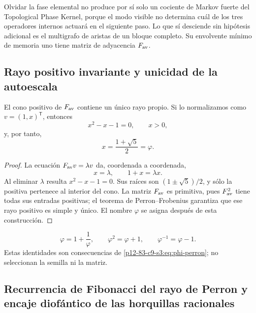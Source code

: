 \begin{remark}
Olvidar la fase elemental no produce por sí solo un cociente de Markov
fuerte del Topological Phase Kernel, porque el modo visible no determina
cuál de los tres operadores internos actuará en el siguiente paso. Lo que
sí desciende sin hipótesis adicional es el multigrafo de aristas de un
bloque completo. Su envolvente mínimo de memoria uno tiene matriz de
adyacencia \(F_{\rm av}\).
\end{remark}

\subsection{Rayo positivo invariante y unicidad de la autoescala}

\begin{theorem}
\label{p12-83-c9-s3:thm:rayo-perron-phi}
El cono positivo de \(F_{\rm av}\) contiene un único rayo propio. Si lo
normalizamos como \(v=(1,x)^{\mathsf T}\), entonces
\[
 x^2-x-1=0,
 \qquad
 x>0,
\]
y, por tanto,
\begin{equation}
 \boxed{x=\frac{1+\sqrt5}{2}=\varphi.}
 \label{p12-83-c9-s3:eq:phi-perron}
\end{equation}
\end{theorem}

\begin{proof}
La ecuación \(F_{\rm av}v=\lambda v\) da, coordenada a coordenada,
\[
 x=\lambda,
 \qquad
 1+x=\lambda x.
\]
Al eliminar \(\lambda\) resulta \(x^2-x-1=0\). Sus raíces son
\((1\pm\sqrt5)/2\), y sólo la positiva pertenece al interior del cono. La
matriz \(F_{\rm av}\) es primitiva, pues \(F_{\rm av}^2\) tiene todas sus
entradas positivas; el teorema de Perron--Frobenius garantiza que ese rayo
positivo es simple y único. El nombre \(\varphi\) se asigna después de esta
construcción.
\end{proof}

\begin{corollary}
\[
 \varphi=1+\frac1\varphi,
 \qquad
 \varphi^2=\varphi+1,
 \qquad
 \varphi^{-1}=\varphi-1.
\]
Estas identidades son consecuencias de \eqref{p12-83-c9-s3:eq:phi-perron}; no seleccionan
la semilla ni la matriz.
\end{corollary}

\subsection{Recurrencia de Fibonacci del rayo de Perron y encaje diofántico de las horquillas racionales}

